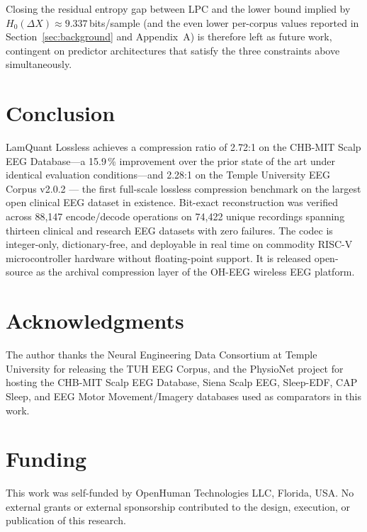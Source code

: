 \documentclass[journal]{IEEEtran}
\begin{document}
Closing the residual entropy gap between LPC and the lower bound
implied by $H_0(\Delta X) \approx 9.337$\,bits/sample (and the even
lower per-corpus values reported in Section~\ref{sec:background}
and Appendix~A) is therefore left as future work, contingent on
predictor architectures that satisfy the three constraints above
simultaneously.


\section{Conclusion}
\label{sec:conclusion}

LamQuant Lossless achieves a compression ratio of 2.72:1 on the
CHB-MIT Scalp EEG Database---a 15.9\,\% improvement over the prior
state of the art under identical evaluation conditions---and 2.28:1
on the Temple University EEG Corpus v2.0.2 — the
first full-scale lossless compression benchmark on the largest
open clinical EEG dataset in existence. Bit-exact reconstruction was verified across
88{,}147 encode/decode operations on 74{,}422 unique recordings
spanning thirteen clinical and research EEG datasets with zero failures. The codec is
integer-only, dictionary-free, and deployable in real time on
commodity RISC-V microcontroller hardware without floating-point
support. It is released open-source as the archival compression layer
of the OH-EEG wireless EEG platform.


\section*{Acknowledgments}
The author thanks the Neural Engineering Data Consortium at Temple
University for releasing the TUH EEG Corpus, and the PhysioNet
project for hosting the CHB-MIT Scalp EEG Database, Siena Scalp
EEG, Sleep-EDF, CAP Sleep, and EEG Motor Movement/Imagery
databases used as comparators in this work.

\section*{Funding}
This work was self-funded by OpenHuman Technologies LLC, Florida,
USA. No external grants or external sponsorship contributed to
the design, execution, or publication of this research.
\end{document}
